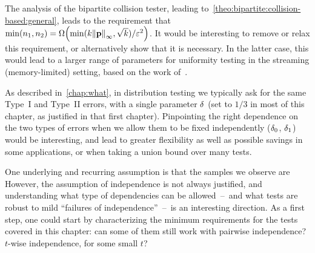 \begin{openproblem}
The analysis of the bipartite collision tester, leading to~\cref{theo:bipartite:collision-based:general}, leads to the requirement that $\min(\ns_1,\ns_2)  = \bigOmega{\min(\ab\norminf{\p},\sqrt{\ab})/\dst^2}$. It would be interesting to remove or relax this requirement, or alternatively show that it is necessary. In the latter case, this would lead to a larger range of parameters for uniformity testing in the streaming (memory-limited) setting, based on the work of~\citet{DiakonikolasGKR19}.
\end{openproblem}

\begin{openproblem}
	\label{op:differentdelta}
As described in~\cref{chap:what}, in distribution testing we typically ask for the same Type~I and Type~II errors, with a single parameter $\delta$ (set to $1/3$ in most of this chapter, as justified in that first chapter). Pinpointing the right dependence on the two types of errors when we allow them to be fixed independently (\ie $\delta_0$, $\delta_1$) would be interesting, and lead to greater flexibility as well as possible savings in some applications, or when taking a union bound over many tests.
\end{openproblem}

\begin{openproblem}
One underlying and recurring assumption is that the samples we observe are \iid However, the assumption of independence is not always justified, and understanding what type of dependencies can be allowed~--~and what tests are robust to mild ``failures of independence''~--~is an interesting direction. As a first step, one could start by characterizing the minimum requirements for the tests covered in this chapter: can some of them still work with pairwise independence? $t$-wise independence, for some small $t$?
\end{openproblem}
